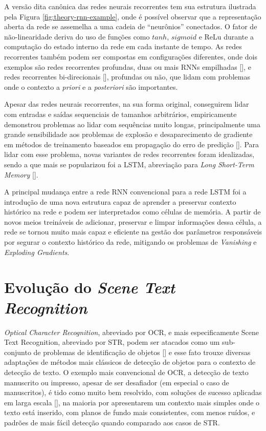 A versão dita canônica das redes neurais recorrentes tem sua estrutura ilustrada pela Figura \ref{fig:theory-rnn-example}, onde é possível observar que a 
representação aberta da rede se assemelha a uma cadeia de “neurônios” conectados. O fator de não-linearidade deriva do uso de funções como $tanh$, $sigmoid$ 
e ReLu durante a computação do estado interno da rede em cada instante de tempo. As redes recorrentes também podem ser compostas em configurações diferentes, 
onde dois exemplos são redes recorrentes profundas, duas ou mais RNNs empilhadas [], e redes recorrentes bi-direcionais [], 
profundas ou não, que lidam com problemas onde o contexto a \textit{priori} e a \textit{posteriori} são importantes.

Apesar das redes neurais recorrentes, na sua forma original, conseguirem lidar com entradas e saídas sequenciais de tamanhos arbitrários, empiricamente 
demonstrou problemas ao lidar com sequências muito longas, principalmente uma grande sensibilidade aos problemas de explosão e desaparecimento de gradiente 
em métodos de treinamento baseados em propagação do erro de predição []. Para lidar com esse problema, novas variantes de redes 
recorrentes foram idealizadas, sendo a que mais se popularizou foi a LSTM, abreviação para \textit{Long Short-Term Memory} [].

A principal mudança entre a rede RNN convencional para a rede LSTM foi a introdução de uma nova estrutura capaz de aprender a preservar contexto histórico 
na rede e podem ser interpretados como células de memória. A partir de novos meios treináveis de adicionar, preservar e limpar informações dessa célula, a 
rede se tornou muito mais capaz e eficiente na gestão dos parâmetros responsáveis por segurar o contexto histórico da rede, mitigando os problemas de 
\textit{Vanishing} e \textit{Exploding Gradients}. 


\section{Evolução do \textit{Scene Text Recognition}}
\textit{Optical Character Recognition}, abreviado por OCR, e mais especificamente Scene Text Recognition, abreviado por STR, podem ser atacados como um 
sub-conjunto de problemas de identificação de objetos [] e esse fato trouxe diversas adaptações de métodos mais clássicos 
de detecção de objetos para o contexto de detecção de texto. O exemplo mais convencional de OCR, a detecção de texto manuscrito ou impresso, apesar de ser 
desafiador (em especial o caso de manuscritos), é tido como muito bem resolvido, com soluções de sucesso aplicadas em larga escala 
[], na maioria por apresentarem um contexto mais simples onde o texto está inserido, com planos de fundo mais 
consistentes, com menos ruídos, e padrões de mais fácil detecção quando comparado aos casos de STR.

